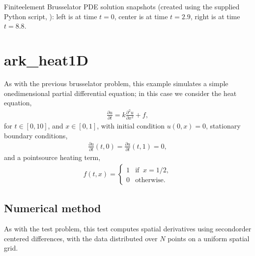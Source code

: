 \documentclass[letterpaper,10pt,english]{sphinxmanual}
\begin{document}
\noindent{}

\noindent{}

\sphinxAtStartPar
Finite\sphinxhyphen{}element Brusselator PDE solution snapshots (created using the
supplied Python script, ): left is at time
\(t=0\), center is at time \(t=2.9\), right is at time
\(t=8.8\).


\section{ark\_heat1D}
\label{\detokenize{c_serial:ark-heat1d}}\label{\detokenize{c_serial:id25}}
\sphinxAtStartPar
As with the previous brusselator problem, this example simulates a
simple one\sphinxhyphen{}dimensional partial differential equation; in this case we
consider the heat equation,
\begin{equation*}
\begin{split}\frac{\partial u}{\partial t} = k \frac{\partial^2 u}{\partial x^2} + f,\end{split}
\end{equation*}
\sphinxAtStartPar
for \(t \in [0, 10]\), and \(x \in [0, 1]\), with initial
condition \(u(0,x) = 0\), stationary boundary conditions,
\begin{equation*}
\begin{split}\frac{\partial u}{\partial t}(t,0) = \frac{\partial u}{\partial t}(t,1) = 0,\end{split}
\end{equation*}
\sphinxAtStartPar
and a point\sphinxhyphen{}source heating term,
\begin{equation*}
\begin{split}f(t,x) = \begin{cases} 1 & \text{if}\;\; x=1/2, \\
                       0 & \text{otherwise}. \end{cases}\end{split}
\end{equation*}

\subsection{Numerical method}
\label{\detokenize{c_serial:id26}}
\sphinxAtStartPar
As with the {\hyperref[\detokenize{c_serial:ark-brusselator1d}]{}} test problem, this test computes
spatial derivatives using second\sphinxhyphen{}order centered differences, with the
data distributed over \(N\) points on a uniform spatial grid.
\end{document}
